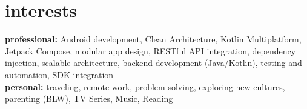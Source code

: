 \documentclass[a4paper,nocolors]{friggeri-cv}
\begin{document}
\section{interests}

\textbf{professional:} Android development, Clean Architecture, Kotlin Multiplatform, Jetpack Compose, modular app design, RESTful API integration, dependency injection, scalable architecture, backend development (Java/Kotlin), testing and automation, SDK integration \\
\textbf{personal:} traveling, remote work, problem-solving, exploring new cultures, parenting (BLW), TV Series, Music, Reading
 
\end{document}
